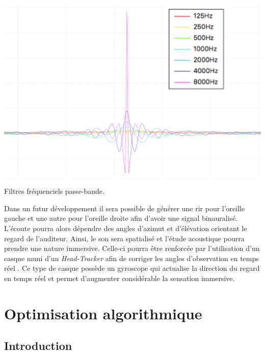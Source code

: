 \begin{figureth}
	\includegraphics[width=0.9\linewidth]{images/filtres}
	\caption{Filtres fréquenciels passe-bande.}
	\label{filtres}
\end{figureth}

Dans un futur développement il sera possible de générer une \gls{rir} pour l'oreille gauche et une autre pour l'oreille droite afin d'avoir une signal binauralisé. L'écoute pourra alors dépendre des angles d'azimut et d'élévation orientant le regard de l'auditeur. Ainsi, le son sera spatialisé et l'étude acoustique pourra prendre une nature immersive. Celle-ci pourra être renforcée par l'utilisation d'un casque muni d'un \textit{Head-Tracker} afin de corriger les angles d'observation en temps réel \cite{myBino}. Ce type de casque possède un gyroscope qui actualise la direction du regard en temps réel et permet d'augmenter considérable la sensation immersive. 

%






\chapter{Optimisation algorithmique}
	\minitoc
	\newpage
	
\section*{Introduction} \label{sect_complexite}

